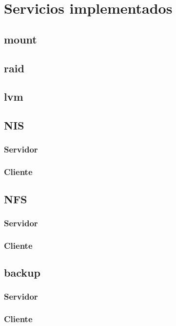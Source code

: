 \documentclass[12pt,a4paper, spanish]{article}
\begin{document}
\section{Servicios implementados}

\subsection{mount}

\subsection{raid}

\subsection{lvm}

\subsection{NIS}
\subsubsection{Servidor}
\subsubsection{Cliente}

\subsection{NFS}
\subsubsection{Servidor}
\subsubsection{Cliente}

\subsection{backup}
\subsubsection{Servidor}
\subsubsection{Cliente}
\end{document}
